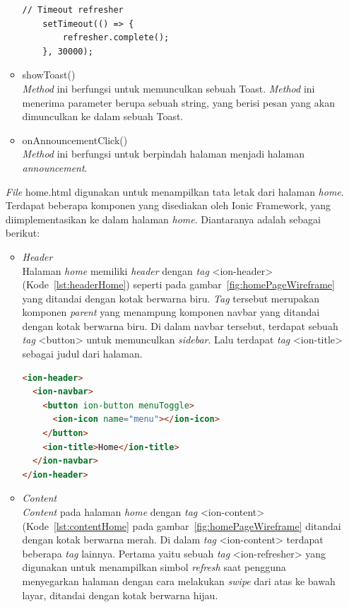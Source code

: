 \begin{itemize}
\begin{itemize}
\begin{lstlisting}[language=html, label={lst:doRefreshHome}, caption=\textit{Method} doRefresh() pada Home]
    // Timeout refresher
    setTimeout(() => {
        refresher.complete();
    }, 30000);
\end{lstlisting}		
	
		\item showToast() \\
		\textit{Method} ini berfungsi untuk memunculkan sebuah Toast. \textit{Method} ini menerima parameter berupa sebuah string, yang berisi pesan yang akan dimunculkan ke dalam sebuah Toast.  
		\item onAnnouncementClick() \\
		\textit{Method} ini berfungsi untuk berpindah halaman menjadi halaman \textit{announcement}.
	\end{itemize}
	
\textit{File} home.html digunakan untuk menampilkan tata letak dari halaman \textit{home}. Terdapat beberapa komponen yang disediakan oleh Ionic Framework, yang diimplementasikan ke dalam halaman \textit{home}. Diantaranya adalah sebagai berikut:	

	\begin{itemize}
		\item \textit{Header} \\
		Halaman \textit{home} memiliki \textit{header} dengan \textit{tag} <ion-header> (Kode~\ref{lst:headerHome}) seperti pada gambar~\ref{fig:homePageWireframe} yang ditandai dengan kotak berwarna biru. \textit{Tag} tersebut merupakan komponen \textit{parent} yang menampung komponen navbar yang ditandai dengan kotak berwarna biru. Di dalam navbar tersebut, terdapat sebuah \textit{tag} <button> untuk memunculkan \textit{sidebar}. Lalu terdapat \textit{tag} <ion-title> sebagai judul dari halaman.
		
\begin{lstlisting}[language=html, label={lst:headerHome}, caption=\textit{Header} pada home.html]
<ion-header>
  <ion-navbar>
    <button ion-button menuToggle>
      <ion-icon name="menu"></ion-icon>
    </button>
    <ion-title>Home</ion-title>
  </ion-navbar>
</ion-header>
\end{lstlisting}

		\item \textit{Content} \\
		\textit{Content} pada halaman \textit{home} dengan \textit{tag} <ion-content> (Kode~\ref{lst:contentHome} pada gambar~\ref{fig:homePageWireframe} ditandai dengan kotak berwarna merah. Di dalam \textit{tag} <ion-content> terdapat beberapa \textit{tag} lainnya. Pertama yaitu sebuah \textit{tag} <ion-refresher> yang digunakan untuk menampilkan simbol \textit{refresh} saat pengguna menyegarkan halaman dengan cara melakukan \textit{swipe} dari atas ke bawah layar, ditandai dengan kotak berwarna hijau. 
		

\end{itemize}
\end{itemize}
